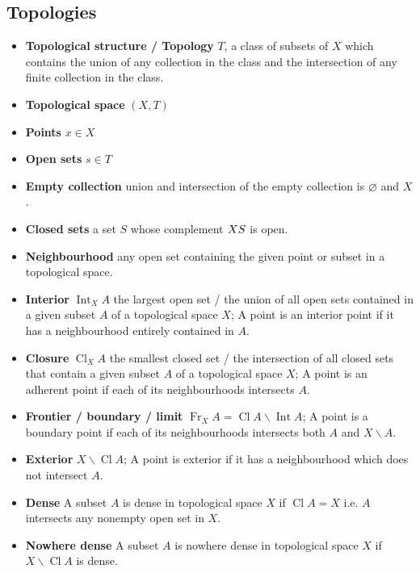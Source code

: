 \documentclass{article}
\DeclareMathOperator{\Int}{Int}
\DeclareMathOperator{\Cl}{Cl}
\DeclareMathOperator{\Fr}{Fr}
\begin{document}
\subsection{Topologies}
\begin{itemize}
\item \textbf{Topological structure / Topology} \(T\), a class of subsets of \(X\) which contains the union of any collection in the class and the intersection of any finite collection in the class.
\item \textbf{Topological space} \((X,T)\)
\item \textbf{Points} \(x\in X\)
\item \textbf{Open sets} \(s\in T\)
\item \textbf{Empty collection} union and intersection of the empty collection is \(\varnothing\) and \(X\).
\item \textbf{Closed sets} a set \(S\) whose complement \(X\\S\) is open.
\item \textbf{Neighbourhood} any open set containing the given point or subset in a topological space.
\item \textbf{Interior} \(\Int_{X} A\) the largest open set / the union of all open sets contained in a given subset \(A\) of a topological space \(X\);
A point is an interior point if it has a neighbourhood entirely contained in \(A\).
\item \textbf{Closure} \(\Cl_{X} A\) the smallest closed set / the intersection of all closed sets that contain a given subset \(A\) of a topological space \(X\);
A point is an adherent point if each of its neighbourhoods intersects \(A\).
\item \textbf{Frontier / boundary / limit} \(\Fr_{X} A=\Cl A\backslash\Int A\); 
A point is a boundary point if each of its neighbourhoods intersects both \(A\) and \(X\backslash A\).
\item \textbf{Exterior} \(X\backslash \Cl A\); A point is exterior if it has a neighbourhood which does not intersect \(A\).
\item \textbf{Dense} A subset \(A\) is dense in topological space \(X\) if \(\Cl A=X\) i.e. \(A\) intersects any nonempty open set in \(X\).
\item \textbf{Nowhere dense} A subset \(A\) is nowhere dense in topological space \(X\) if \(X\backslash \Cl A\) is dense.
\end{itemize}
\end{document}
